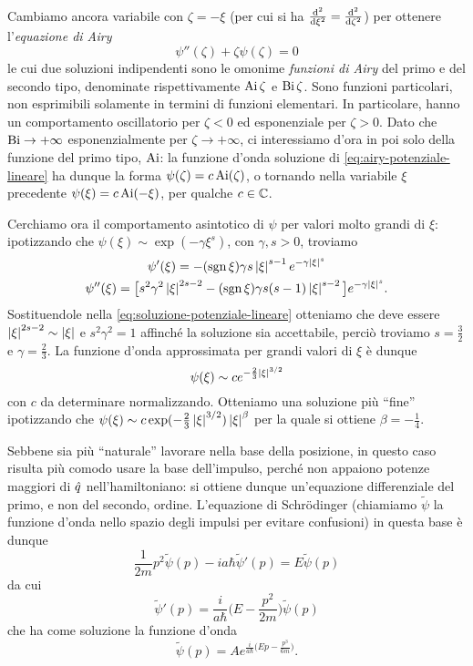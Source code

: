 Cambiamo ancora variabile con $\zeta=-\xi$ (per cui si ha $\frac{\textup{d}^2 {}}{\textup{d} {\xi}^2}=\frac{\textup{d}^2 {}}{\textup{d} {\zeta}^2}$) per ottenere l'\emph{equazione di Airy}
\begin{equation}
	\psi''(\zeta)+\zeta\psi(\zeta)=0
	\label{eq:airy-potenziale-lineare}
\end{equation}
le cui due soluzioni indipendenti sono le omonime \emph{funzioni di Airy} del primo e del secondo tipo, denominate rispettivamente $\operatorname{Ai}\zeta$ e $\operatorname{Bi}\zeta$.
Sono funzioni particolari, non esprimibili solamente in termini di funzioni elementari.
In particolare, hanno un comportamento oscillatorio per $\zeta<0$ ed esponenziale per $\zeta>0$.
Dato che $\operatorname{Bi}\to+\infty$ esponenzialmente per $\zeta\to+\infty$, ci interessiamo d'ora in poi solo della funzione del primo tipo, $\operatorname{Ai}$: la funzione d'onda soluzione di \eqref{eq:airy-potenziale-lineare} ha dunque la forma $\psi(\zeta)=c\operatorname{Ai}(\zeta)$, o tornando nella variabile $\xi$ precedente $\psi(\xi)=c\operatorname{Ai}(-\xi)$, per qualche $c\in\mathbb{C}$.

Cerchiamo ora il comportamento asintotico di $\psi$ per valori molto grandi di $\xi$: ipotizzando che $\psi(\xi)\sim\exp(-\gamma{\xi}^s)$, con $\gamma,s>0$, troviamo
\begin{gather*}
	\psi'(\xi)=-(\operatorname{sgn}\xi)\gamma s\left|{\xi}\right|^{s-1}e^{-\gamma\left|{\xi}\right|^s}\\
	\psi''(\xi)=\big[s^2\gamma^2\left|{\xi}\right|^{2s-2}-(\operatorname{sgn}\xi)\gamma s(s-1)\left|{\xi}\right|^{s-2}\big]e^{-\gamma\left|{\xi}\right|^s}.
\end{gather*}
Sostituendole nella \eqref{eq:soluzione-potenziale-lineare} otteniamo che deve essere $\left|{\xi}\right|^{2s-2}\sim\left|{\xi}\right|$ e $s^2\gamma^2=1$ affinch\'e la soluzione sia accettabile, perciò troviamo $s=\frac32$ e $\gamma=\frac23$.
La funzione d'onda approssimata per grandi valori di $\xi$ è dunque
\begin{equation}
	\psi(\xi)\sim ce^{-\frac23\left|{\xi}\right|^{3/2}}
\end{equation}
con $c$ da determinare normalizzando.
Otteniamo una soluzione più ``fine'' ipotizzando che $\psi(\xi)\sim c\exp(-\frac23\left|{\xi}\right|^{3/2})\left|{\xi}\right|^\beta$ per la quale si ottiene $\beta=-\frac14$.

Sebbene sia più ``naturale'' lavorare nella base della posizione, in questo caso risulta più comodo usare la base dell'impulso, perch\'e non appaiono potenze maggiori di $\hat{q}$ nell'hamiltoniano: si ottiene dunque un'equazione differenziale del primo, e non del secondo, ordine.
L'equazione di Schr\"odinger (chiamiamo $\tilde{\psi}$ la funzione d'onda nello spazio degli impulsi per evitare confusioni) in questa base è dunque
\begin{equation}
	\frac1{2m}p^2\tilde{\psi}(p)-ia\hbar\tilde{\psi}'(p)=E\tilde{\psi}(p)
	\label{eq:schrodinger-impulso-potenziale-lineare}
\end{equation}
da cui
\begin{equation}
	\tilde{\psi}'(p)=\frac{i}{a\hbar}\bigg(E-\frac{p^2}{2m}\bigg)\tilde{\psi}(p)
\end{equation}
che ha come soluzione la funzione d'onda
\begin{equation}
	\tilde{\psi}(p)=Ae^{\frac{i}{a\hbar}\big(Ep-\frac{p^3}{6m}\big)}.
\end{equation}

